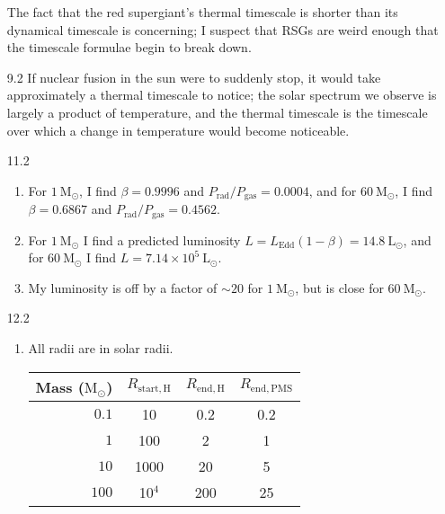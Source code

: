 \documentclass[11pt]{article}
\newcommand\lsol{\mathrm{L}_\odot}
\newcommand\msol{\mathrm{M}_\odot}
\begin{document}
\begin{enumerate}
    The fact that the red supergiant's thermal timescale is shorter than its dynamical timescale is concerning; I suspect that RSGs are weird enough that the timescale formulae begin to break down.

\item [9.2]
    If nuclear fusion in the sun were to suddenly stop, it would take approximately a thermal timescale to notice; the solar spectrum we observe is largely a product of temperature, and the thermal timescale is the timescale over which a change in temperature would become noticeable.

\item [11.2]
	\begin{enumerate}
	
    \item For $1~\msol$, I find $\beta = 0.9996$ and $P_\mathrm{rad}/P_\mathrm{gas} = 0.0004$, and for $60~\msol$, I find $\beta = 0.6867$ and $P_\mathrm{rad}/P_\mathrm{gas} = 0.4562$.
    
    \item For $1~\msol$ I find a predicted luminosity $L = L_\mathrm{Edd}(1-\beta) = 14.8~\lsol$, and for $60~\msol$ I find $L = 7.14\times10^5~\lsol$.
    
    \item My luminosity is off by a factor of $\sim\!20$ for $1~\msol$, but is close for $60~\msol$.
    
    \end{enumerate}

\item [12.2] %
	\begin{enumerate}
    
    \item All radii are in solar radii.
    	\begin{table}[H]
        \centering
        \begin{tabular}{ r | c | c | c }
          Mass ($\msol$) & $R_\mathrm{start,H}$ & $R_\mathrm{end,H}$ & $R_\mathrm{end,PMS}$ \\ \hline
          $0.1$ & 10 & 0.2 & 0.2 \\
          $1$ & 100 & 2 & 1 \\
          $10$ & 1000 & 20 & 5 \\
          $100$ & 10$^4$ & 200 & 25 \\
        \end{tabular}
        \end{table}


\end{enumerate}
\end{enumerate}
\end{document}
